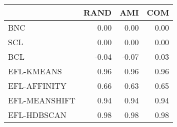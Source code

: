 \begin{tabular}{lrrr}
\toprule
 & RAND & AMI & COM \\
\midrule
BNC & 0.00 & 0.00 & 0.00 \\
SCL & 0.00 & 0.00 & 0.00 \\
BCL & -0.04 & -0.07 & 0.03 \\
EFL-KMEANS & 0.96 & 0.96 & 0.96 \\
EFL-AFFINITY & 0.66 & 0.63 & 0.65 \\
EFL-MEANSHIFT & 0.94 & 0.94 & 0.94 \\
EFL-HDBSCAN & 0.98 & 0.98 & 0.98 \\
\bottomrule
\end{tabular}
